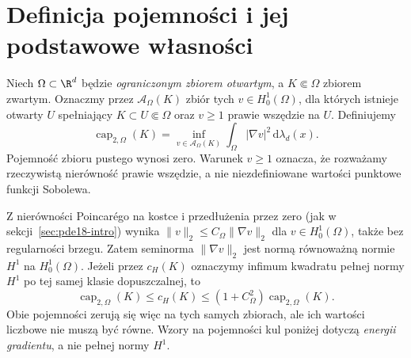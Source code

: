\section{Definicja pojemności i jej podstawowe własności}
\label{sec:pde19-capacity}
\begin{definicja}
\label{def:pde19-cap}
Niech $\Omega\subset\R^d$ będzie \emph{ograniczonym zbiorem otwartym},
a $K\Subset\Omega$ zbiorem zwartym. Oznaczmy przez $\mathcal A_\Omega(K)$ zbiór tych $v\in H_0^1(\Omega)$,
dla których istnieje otwarty $U$ spełniający $K\subset U\Subset\Omega$
oraz $v\ge1$ prawie wszędzie na $U$. Definiujemy
\begin{equation}\label{eq:pde19-cap}
 \operatorname{cap}_{2,\Omega}(K)=
 \inf_{v\in\mathcal A_\Omega(K)}
 \int_\Omega|\nabla v|^2\,\mathrm d\lambda_d(x).
\end{equation}
Pojemność zbioru pustego wynosi zero. Warunek $v\ge1$ oznacza,
że rozważamy rzeczywistą nierówność prawie wszędzie, a nie
niezdefiniowane wartości punktowe funkcji Sobolewa.
\end{definicja}

\begin{uwaga}
Z nierówności Poincarégo na kostce i przedłużenia
przez zero (jak w sekcji~\ref{sec:pde18-intro}) wynika
$\|v\|_2\le C_\Omega\|\nabla v\|_2$ dla $v\in H_0^1(\Omega)$,
także bez regularności brzegu. Zatem seminorma
$\|\nabla v\|_2$ jest normą równoważną normie $H^1$
na $H_0^1(\Omega)$. Jeżeli przez $c_H(K)$ oznaczymy
infimum kwadratu pełnej normy $H^1$ po tej samej
klasie dopuszczalnej, to
\[
 \operatorname{cap}_{2,\Omega}(K)\le c_H(K)
 \le (1+C_\Omega^2)\operatorname{cap}_{2,\Omega}(K).
\]
Obie pojemności zerują się więc na tych samych zbiorach,
ale ich wartości liczbowe nie muszą być równe. Wzory na pojemności kul poniżej dotyczą
\emph{energii gradientu}, a nie pełnej normy $H^1$.
\end{uwaga}

